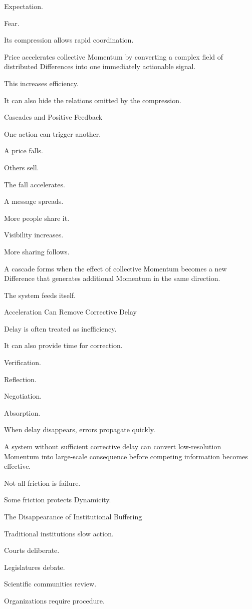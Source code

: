 Expectation.

Fear.

Its compression allows rapid coordination.

Price accelerates collective Momentum by converting a complex field of distributed Differences into one immediately actionable signal.

This increases efficiency.

It can also hide the relations omitted by the compression.

Cascades and Positive Feedback

One action can trigger another.

A price falls.

Others sell.

The fall accelerates.

A message spreads.

More people share it.

Visibility increases.

More sharing follows.

A cascade forms when the effect of collective Momentum becomes a new Difference that generates additional Momentum in the same direction.

The system feeds itself.

Acceleration Can Remove Corrective Delay

Delay is often treated as inefficiency.

It can also provide time for correction.

Verification.

Reflection.

Negotiation.

Absorption.

When delay disappears, errors propagate quickly.

A system without sufficient corrective delay can convert low-resolution Momentum into large-scale consequence before competing information becomes effective.

Not all friction is failure.

Some friction protects Dynamicity.

The Disappearance of Institutional Buffering

Traditional institutions slow action.

Courts deliberate.

Legislatures debate.

Scientific communities review.

Organizations require procedure.

